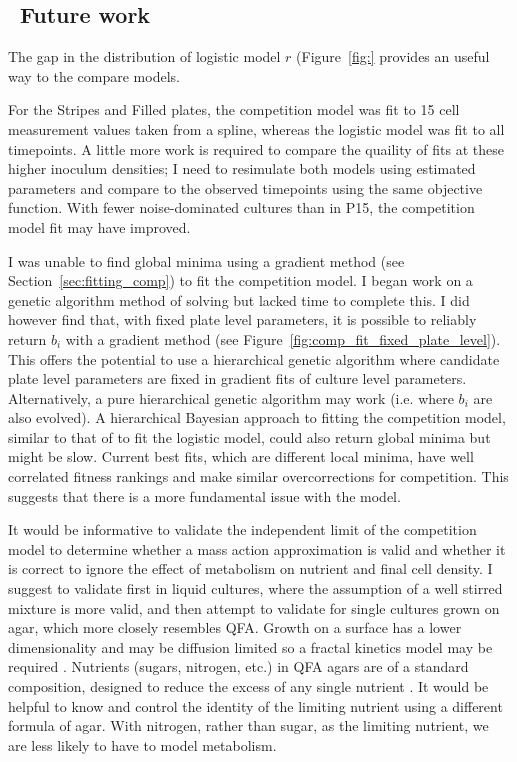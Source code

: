 \subsection{\thesubsection~Future work}


The gap in the distribution of logistic model \(r\) (Figure~\ref{fig:}
provides an useful way to the compare models.

For the Stripes and Filled plates, the competition model was fit to 15
cell measurement values taken from a spline, whereas the logistic
model was fit to all timepoints. A little more work is required to
compare the quaility of fits at these higher inoculum densities; I
need to resimulate both models using estimated parameters and compare
to the observed timepoints using the same objective function. With
fewer noise-dominated cultures than in P15, the competition model fit
may have improved.

I was unable to find global minima using a gradient method (see
Section~\ref{sec:fitting_comp}) to fit the competition model. I began
work on a genetic algorithm method of solving but lacked time to
complete this. I did however find that, with fixed plate level
parameters, it is possible to reliably return \(b_{i}\) with a
gradient method (see
Figure~\ref{fig:comp_fit_fixed_plate_level}). This offers the
potential to use a hierarchical genetic algorithm where candidate
plate level parameters are fixed in gradient fits of culture level
parameters. Alternatively, a pure hierarchical genetic algorithm may
work (i.e. where \(b_{i}\) are also evolved). A hierarchical Bayesian
approach to fitting the competition model, similar to that of
\citet{Heydari2016} to fit the logistic model, could also return
global minima but might be slow. Current best fits, which are
different local minima, have well correlated fitness rankings and make
similar overcorrections for competition. This suggests that there is a
more fundamental issue with the model.

It would be informative to validate the independent limit of the
competition model to determine whether a mass action approximation is
valid and whether it is correct to ignore the effect of metabolism on
nutrient and final cell density. I suggest to validate first in liquid
cultures, where the assumption of a well stirred mixture is more
valid, and then attempt to validate for single cultures grown on agar,
which more closely resembles QFA. Growth on a surface has a lower
dimensionality and may be diffusion limited so a fractal kinetics
model may be required \citep{Kopelman1988,savageau1995}. Nutrients
(sugars, nitrogen, etc.) in QFA agars are of a standard composition,
designed to reduce the excess of any single nutrient
\citep{Addinall2011}. It would be helpful to know and control the
identity of the limiting nutrient using a different formula of
agar. With nitrogen, rather than sugar, as the limiting nutrient, we
are less likely to have to model metabolism.


